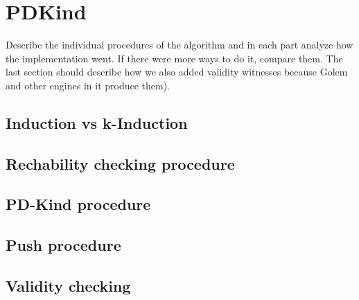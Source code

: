 \chapter{PDKind}

Describe the individual procedures of the algorithm and in each part analyze how the implementation went. If there were more ways to do it, compare them.
The last section should describe how we also added validity witnesses because Golem and other engines in it produce them).

\section{Induction vs k-Induction}

\section{Rechability checking procedure}

\section{PD-Kind procedure}

\section{Push procedure}




\section{Validity checking}

